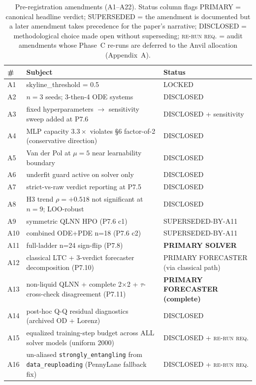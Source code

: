 \documentclass[%
  prx,
  amsmath,
  amssymb,
  aps,
  reprint,
  superscriptaddress,
  floatfix,
]{revtex4-2}
\newcommand{\vdp}{Van der Pol}
\begin{document}
\begin{table}[t]
\centering
\caption{Pre-registration amendments (A1--A22). Status column
flags PRIMARY = canonical headline verdict; SUPERSEDED = the
amendment is documented but a later amendment takes precedence
for the paper's narrative; DISCLOSED = methodological choice
made open without superseding; \textsc{re-run req.} = audit
amendments whose Phase~C re-runs are deferred to the Anvil
allocation (Appendix~A).}
\label{sup:tab:amendments}
\small
\begin{tabular}{lll}
\toprule
\# & Subject & Status \\
\midrule
A1 & skyline\_threshold = 0.5 & LOCKED \\
A2 & $n=3$ seeds; 3-then-4 ODE systems & DISCLOSED \\
A3 & fixed hyperparameters $\to$ sensitivity sweep added at P7.6 & DISCLOSED + sensitivity \\
A4 & MLP capacity $3.3\times$ violates §6 factor-of-2 (conservative direction) & DISCLOSED \\
A5 & \vdp{} at $\mu=5$ near learnability boundary & DISCLOSED \\
A6 & underfit guard active on solver only & DISCLOSED \\
A7 & strict-vs-raw verdict reporting at P7.5 & DISCLOSED \\
A8 & H3 trend $\rho = +0.518$ not significant at $n=9$; LOO-robust & DISCLOSED \\
A9 & symmetric QLNN HPO (P7.6 c1) & SUPERSEDED-BY-A11 \\
A10 & combined ODE+PDE n=18 (P7.6 c2) & SUPERSEDED-BY-A11 \\
A11 & full-ladder n=24 sign-flip (P7.8) & \textbf{PRIMARY SOLVER} \\
A12 & classical LTC + 3-verdict forecaster decomposition (P7.10) & PRIMARY FORECASTER (via classical path) \\
A13 & non-liquid QLNN + complete 2$\times$2 + $\tau$-cross-check disagreement (P7.11) & \textbf{PRIMARY FORECASTER (complete)} \\
\midrule
A14 & post-hoc Q-Q residual diagnostics (archived OD + Lorenz) & DISCLOSED \\
\midrule
A15 & equalized training-step budget across ALL solver models (uniform 2000) & DISCLOSED + \textsc{re-run req.} \\
A16 & un-aliased \texttt{strongly\_entangling} from \texttt{data\_reuploading} (PennyLane fallback fix) & DISCLOSED + \textsc{re-run req.} \\

\end{tabular}
\end{table}
\end{document}
